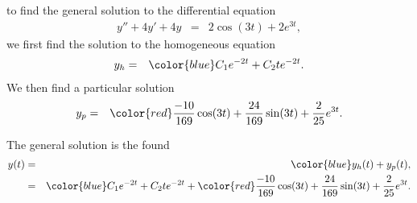 \begin{frame}

  to find the general solution to the differential equation
  \begin{eqnarray*}
    y'' + 4y' + 4y & = & 2 \cos(3t) + 2e^{3t},
  \end{eqnarray*}
  we first find the solution to the homogeneous equation
  \begin{eqnarray*}
    y_h & = & {\color{blue}C_1 e^{-2t} + C_2 t e^{-2t}}.
  \end{eqnarray*}
  We then find a particular solution
  \begin{eqnarray*}
    y_p & = & {\color{red}\frac{-10}{169}\cos(3t) + \frac{24}{169} \sin(3t) + \frac{2}{25}  e^{3t}}.
  \end{eqnarray*}

  The general solution is the found
  \begin{eqnarray*}
    y(t) & = & {\color{blue}y_h(t)} + y_p(t), \\
         & = & {\color{blue}C_1 e^{-2t} + C_2 t e^{-2t}} + {\color{red}\frac{-10}{169}\cos(3t) +
               \frac{24}{169} \sin(3t) + \frac{2}{25}  e^{3t}}.
  \end{eqnarray*}
  
\end{frame}



